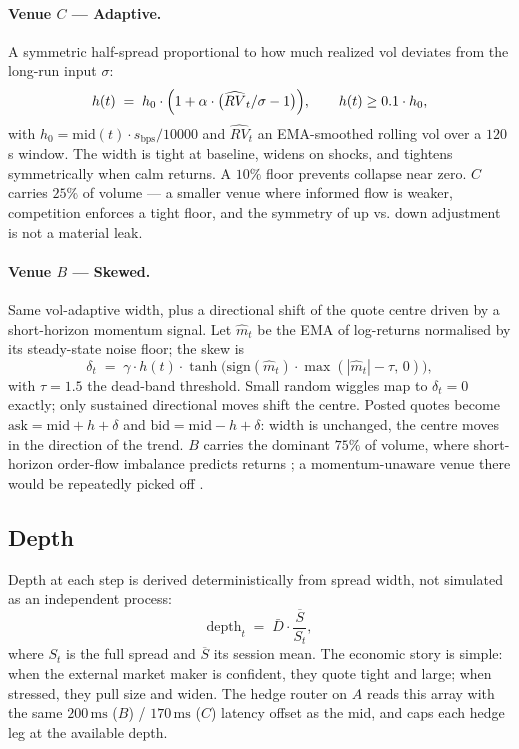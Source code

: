 \paragraph{Venue $C$ --- Adaptive.}
A symmetric half-spread proportional to how much realized vol deviates
from the long-run input $\sigma$:
\[
  h(t) \;=\; h_0 \cdot \Bigl(1 + \alpha \cdot \bigl(\widehat{RV}_t/\sigma - 1\bigr)\Bigr),
  \qquad h(t) \geq 0.1 \cdot h_0,
\]
with $h_0 = \mathrm{mid}(t) \cdot s_{\mathrm{bps}} / 10000$ and
$\widehat{RV}_t$ an EMA-smoothed rolling vol over a $120$\,s window.
The width is tight at baseline, widens on shocks, and tightens
symmetrically when calm returns. A $10\%$ floor prevents collapse near
zero. $C$ carries $25\%$ of volume --- a smaller venue where informed
flow is weaker, competition enforces a tight floor, and the symmetry
of up vs. down adjustment is not a material leak.

\paragraph{Venue $B$ --- Skewed.}
Same vol-adaptive width, plus a directional shift of the quote centre
driven by a short-horizon momentum signal. Let $\hat m_t$ be the
EMA of log-returns normalised by its steady-state noise floor; the
skew is
\[
  \delta_t \;=\; \gamma \cdot h(t) \cdot \tanh\!\bigl(\mathrm{sign}(\hat m_t)\cdot
           \max(|\hat m_t| - \tau,\, 0)\bigr),
\]
with $\tau = 1.5$ the dead-band threshold. Small random wiggles map to
$\delta_t = 0$ exactly; only sustained directional moves shift the
centre. Posted quotes become $\mathrm{ask} = \mathrm{mid} + h + \delta$
and $\mathrm{bid} = \mathrm{mid} - h + \delta$: width is unchanged,
the centre moves in the direction of the trend. $B$ carries the
dominant $75\%$ of volume, where short-horizon order-flow imbalance
predicts returns \citep{cont2014price}; a momentum-unaware venue there
would be repeatedly picked off \citep{engle2004impacts,biais1995empirical}.

\subsection{Depth}
\label{sec:ms-depth}

Depth at each step is derived deterministically from spread width, not
simulated as an independent process:
\[
  \mathrm{depth}_t \;=\; \bar D \cdot \frac{\overline{S}}{S_t},
\]
where $S_t$ is the full spread and $\overline{S}$ its session mean.
The economic story is simple: when the external market maker is
confident, they quote tight and large; when stressed, they pull size
and widen. The hedge router on $A$ reads this array with the same
$200\,\mathrm{ms}$ ($B$) / $170\,\mathrm{ms}$ ($C$) latency offset as the
mid, and caps each hedge leg at the available depth.

